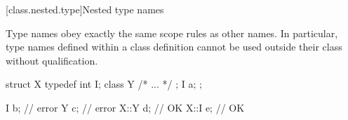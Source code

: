 [class.nested.type]{Nested type names}
%
%

\pnum
Type names obey exactly the same scope rules as other names. In
particular, type names defined within a class definition cannot be used
outside their class without qualification.
\enterexample

%
\begin{codeblock}
struct X {
  typedef int I;
  class Y { /* ... */ };
  I a;
};

I b;                            // error
Y c;                            // error
X::Y d;                         // OK
X::I e;                         // OK
\end{codeblock}
\exitexample%
